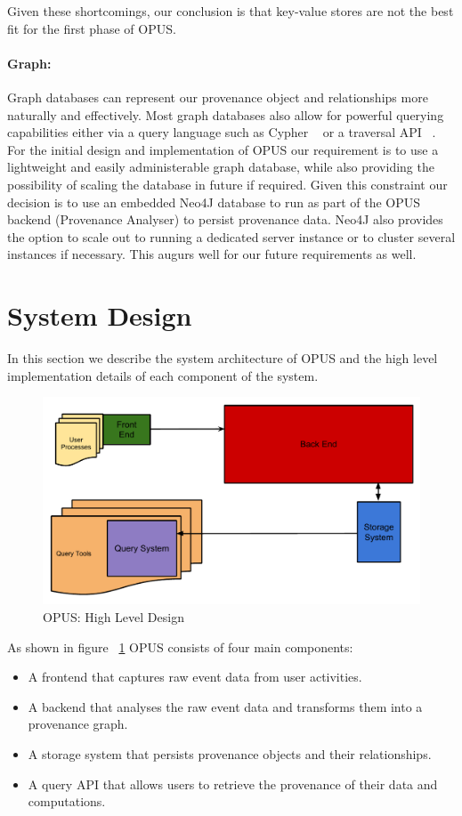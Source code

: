 \documentclass[withindex,glossary]{cam-thesis}
\begin{document}
Given these shortcomings, our conclusion is that key-value stores are not the best fit for the first phase of OPUS.

\paragraph{Graph:} 
Graph databases can represent our provenance object and relationships more naturally and effectively.
Most graph databases also allow for powerful querying capabilities either via a query language such as Cypher ~\cite{Cypher}  or a traversal API ~\cite{Gremlin}.
For the initial design and implementation of OPUS our requirement is to use a lightweight and easily administerable graph database, while also providing the possibility of scaling the database in future if required.
Given this constraint our decision is to use an embedded Neo4J database to run as part of the OPUS backend (Provenance Analyser) to persist provenance data.
Neo4J also provides the option to scale out to running a dedicated server instance or to cluster several instances if necessary.
This augurs well for our future requirements as well.

\section{System Design}
In this section we describe the system architecture of OPUS and the high level implementation details of each component of the system.

\begin{figure}[t!]
  \centering
    \includegraphics[width=1.0\columnwidth]{BroadProvDesign}
  \caption{OPUS: High Level Design}
  \label{fig:opushld}
\end{figure}

As shown in figure ~\ref{fig:opushld} OPUS consists of four main components:
\begin{itemize}
\item A frontend that captures raw event data from user activities.
\item A backend that analyses the raw event data and transforms them into a provenance graph.
\item A storage system that persists provenance objects and their relationships.
\item A query API that allows users to retrieve the provenance of their data and computations.
\end{itemize} 
\end{document}
